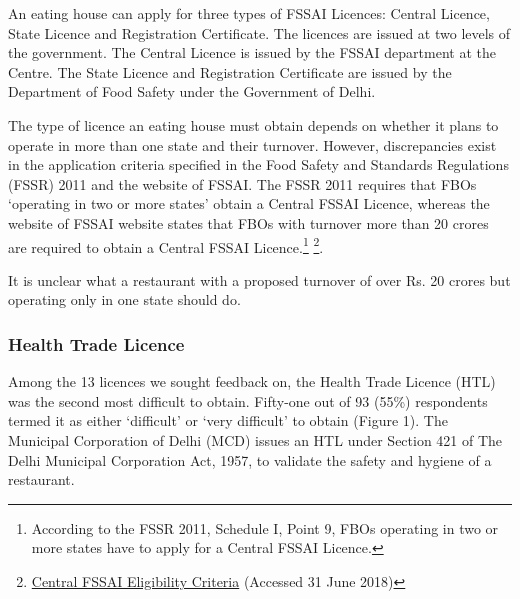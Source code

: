 \documentclass[a4paper, 12pt]{article}
\begin{document}
                    An eating house can apply for three types of FSSAI Licences: Central Licence, State Licence and Registration Certificate. The licences are issued at two levels of the government. The Central Licence is issued by the FSSAI department at the Centre. 
The State Licence and Registration Certificate are issued by the Department of Food Safety under the Government of Delhi.
                    
                    The type of licence an eating house must obtain depends on whether it plans to operate in more than one state and their turnover. However, discrepancies exist in the application criteria specified in the Food Safety and Standards Regulations 
(FSSR) 2011 and the website of FSSAI. The FSSR 2011 requires that FBOs ‘operating in two or more states’ obtain a Central FSSAI Licence, whereas the website of FSSAI website states that FBOs with turnover more than 20 crores are required to obtain a 
Central FSSAI Licence.\footnote{According to the FSSR 2011, Schedule I, Point 9, FBOs operating in two or more states have to apply for a Central FSSAI Licence.} \footnote{\href{https://bit.ly/2pbFEXM}{Central FSSAI Eligibility Criteria} (Accessed 31 June 
2018)}.
                    
                    It is unclear what a restaurant with a proposed turnover of over Rs. 20 crores but operating only in one state should do. %
                    
                    
                          
                                         
                    \subsubsection{Health Trade Licence}
                    Among the 13 licences we sought feedback on, the Health Trade Licence (HTL) was the second most difficult to obtain. Fifty-one out of 93 (55\%) respondents termed it as either ‘difficult’ or ‘very difficult’ to obtain (Figure 1). The Municipal Corporation 
of Delhi (MCD) issues an HTL under Section 421 of The Delhi Municipal Corporation Act, 1957, to validate the safety and hygiene of a restaurant.
                    
\end{document}
